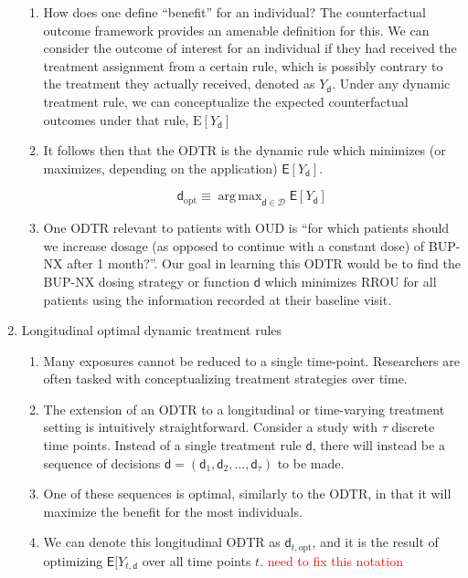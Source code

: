\documentclass[11pt]{article}
\DeclareMathOperator*{\argmax}{arg\,max}
\renewcommand{\d}{\mathsf{d}}
\newcommand{\E}{\mathsf{E}}
\begin{document}
\begin{enumerate}
\begin{enumerate}
		\item How does one define ``benefit'' for an individual? The counterfactual outcome framework provides an amenable definition for this. We can consider the outcome of interest for an individual if they had received the treatment assignment from a certain rule, which is possibly contrary to the treatment they actually received, denoted as $Y_\d$. Under any dynamic treatment rule, we can conceptualize the expected counterfactual outcomes under that rule, $\mathrm{E}[Y_\d]$
		
		\item It follows then that the ODTR is the dynamic rule which minimizes (or maximizes, depending on the application) $\E[Y_\d]$.
		
		$$
		\d_{\text{opt}} \equiv \argmax_{\d \in \mathcal{D}} \E [Y_{\d}]
		$$
		
		\item One ODTR relevant to patients with OUD is ``for which patients should we increase dosage (as opposed to continue with a constant dose) of BUP-NX after 1 month?''. Our goal in learning this ODTR would be to find the BUP-NX dosing strategy or function $\d$ which minimizes RROU for all patients using the information recorded at their baseline visit.
		
		
	\end{enumerate}

	\item Longitudinal optimal dynamic treatment rules
	
	\begin{enumerate}
		
		\item Many exposures cannot be reduced to a single time-point. Researchers are often tasked with conceptualizing treatment strategies over time. 
		
		\item The extension of an ODTR to a longitudinal or time-varying treatment setting is intuitively straightforward. Consider a study with $\tau$ discrete time points. Instead of a single treatment rule $\d$, there will instead be a sequence of decisions $\d = (\d_1, \d_2, \dots, \d_\tau)$ to be made.
		
		\item One of these sequences is optimal, similarly to the ODTR, in that it will maximize the benefit for the most individuals.
		
		\item We can denote this longitudinal ODTR as $\d_{t,\text{opt}}$, and it is the result of optimizing $\E [Y_{t,\d}$ over all time points $t$. \textcolor{red}{need to fix this notation}
		

\end{enumerate}
\end{enumerate}
\end{document}
